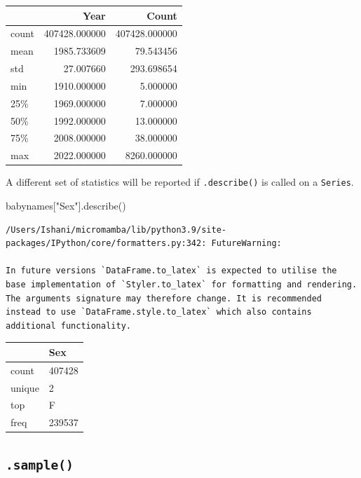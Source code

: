 \documentclass[
  letterpaper,
  DIV=11,
  numbers=noendperiod]{scrreprt}
\newenvironment{Shaded}{\begin{snugshade}}{\end{snugshade}}
\newcommand{\NormalTok}[1]{\textcolor[rgb]{0.00,0.23,0.31}{#1}}
\newcommand{\StringTok}[1]{\textcolor[rgb]{0.13,0.47,0.30}{#1}}
\begin{document}
\begin{tabular}{lrr}
\toprule
{} &           Year &          Count \\
\midrule
count &  407428.000000 &  407428.000000 \\
mean  &    1985.733609 &      79.543456 \\
std   &      27.007660 &     293.698654 \\
min   &    1910.000000 &       5.000000 \\
25\%   &    1969.000000 &       7.000000 \\
50\%   &    1992.000000 &      13.000000 \\
75\%   &    2008.000000 &      38.000000 \\
max   &    2022.000000 &    8260.000000 \\
\bottomrule
\end{tabular}

A different set of statistics will be reported if \texttt{.describe()}
is called on a \texttt{Series}.

\begin{Shaded}
\begin{Highlighting}[]
\NormalTok{babynames[}\StringTok{"Sex"}\NormalTok{].describe()}
\end{Highlighting}
\end{Shaded}

\begin{verbatim}
/Users/Ishani/micromamba/lib/python3.9/site-packages/IPython/core/formatters.py:342: FutureWarning:

In future versions `DataFrame.to_latex` is expected to utilise the base implementation of `Styler.to_latex` for formatting and rendering. The arguments signature may therefore change. It is recommended instead to use `DataFrame.style.to_latex` which also contains additional functionality.
\end{verbatim}

\begin{tabular}{ll}
\toprule
{} &     Sex \\
\midrule
count  &  407428 \\
unique &       2 \\
top    &       F \\
freq   &  239537 \\
\bottomrule
\end{tabular}

\hypertarget{sample}{%
\subsection{\texorpdfstring{\texttt{.sample()}}{.sample()}}\label{sample}}
\end{document}
